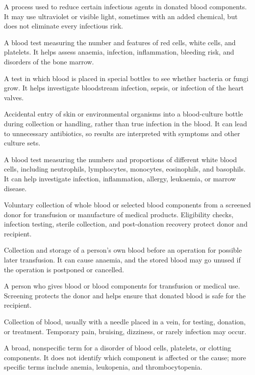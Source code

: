  A process used to reduce certain infectious agents in donated blood components. It may use ultraviolet or visible light, sometimes with an added chemical, but does not eliminate every infectious risk.

 A blood test measuring the number and features of red cells, white cells, and platelets. It helps assess anaemia, infection, inflammation, bleeding risk, and disorders of the bone marrow.

 A test in which blood is placed in special bottles to see whether bacteria or fungi grow. It helps investigate bloodstream infection, sepsis, or infection of the heart valves.

 Accidental entry of skin or environmental organisms into a blood-culture bottle during collection or handling, rather than true infection in the blood. It can lead to unnecessary antibiotics, so results are interpreted with symptoms and other culture sets.

 A blood test measuring the numbers and proportions of different white blood cells, including neutrophils, lymphocytes, monocytes, eosinophils, and basophils. It can help investigate infection, inflammation, allergy, leukaemia, or marrow disease.

 Voluntary collection of whole blood or selected blood components from a screened donor for transfusion or manufacture of medical products. Eligibility checks, infection testing, sterile collection, and post-donation recovery protect donor and recipient.

 Collection and storage of a person's own blood before an operation for possible later transfusion. It can cause anaemia, and the stored blood may go unused if the operation is postponed or cancelled.

 A person who gives blood or blood components for transfusion or medical use. Screening protects the donor and helps ensure that donated blood is safe for the recipient.

 Collection of blood, usually with a needle placed in a vein, for testing, donation, or treatment. Temporary pain, bruising, dizziness, or rarely infection may occur.

 A broad, nonspecific term for a disorder of blood cells, platelets, or clotting components. It does not identify which component is affected or the cause; more specific terms include anemia, leukopenia, and thrombocytopenia.

